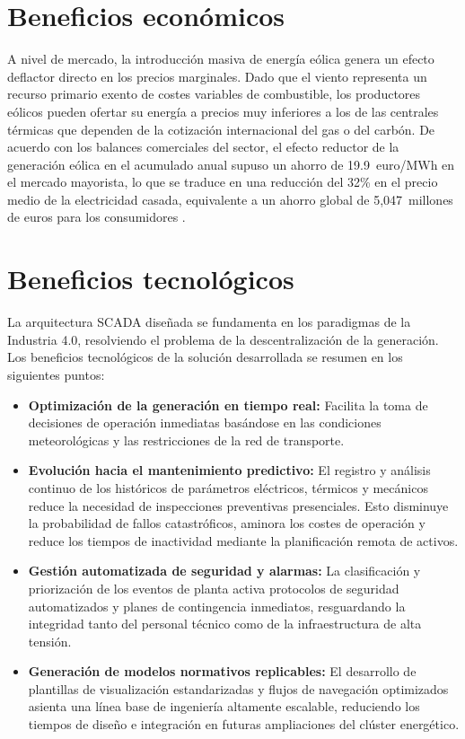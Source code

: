\section{Beneficios económicos}
\label{subsec:beneficios_economicos}

A nivel de mercado, la introducción masiva de energía eólica genera un efecto deflactor directo en los precios marginales\cite{FIGUEIREDO201954}. Dado que el viento representa un recurso primario exento de costes variables de combustible, los productores eólicos pueden ofertar su energía a precios muy inferiores a los de las centrales térmicas que dependen de la cotización internacional del gas o del carbón. De acuerdo con los balances comerciales del sector, el efecto reductor de la generación eólica en el acumulado anual supuso un ahorro de 19.9~euro/$\text{MWh}$ en el mercado mayorista, lo que se traduce en una reducción del 32\% en el precio medio de la electricidad casada, equivalente a un ahorro global de 5,047~millones de euros para los consumidores \cite{aeeAnuario2025}.

\section{Beneficios tecnológicos}
\label{subsec:beneficios_scada}

La arquitectura \ac{SCADA} diseñada se fundamenta en los paradigmas de la Industria 4.0, resolviendo el problema de la descentralización de la generación. Los beneficios tecnológicos de la solución desarrollada se resumen en los siguientes puntos:
\begin{itemize}
    \item \textbf{Optimización de la generación en tiempo real:} Facilita la toma de decisiones de operación inmediatas basándose en las condiciones meteorológicas y las restricciones de la red de transporte.
    \item \textbf{Evolución hacia el mantenimiento predictivo:} El registro y análisis continuo de los históricos de parámetros eléctricos, térmicos y mecánicos reduce la necesidad de inspecciones preventivas presenciales. Esto disminuye la probabilidad de fallos catastróficos, aminora los costes de operación y reduce los tiempos de inactividad mediante la planificación remota de activos.
    \item \textbf{Gestión automatizada de seguridad y alarmas:} La clasificación y priorización de los eventos de planta activa protocolos de seguridad automatizados y planes de contingencia inmediatos, resguardando la integridad tanto del personal técnico como de la infraestructura de alta tensión.
    \item \textbf{Generación de modelos normativos replicables:} El desarrollo de plantillas de visualización estandarizadas y flujos de navegación optimizados asienta una línea base de ingeniería altamente escalable, reduciendo los tiempos de diseño e integración en futuras ampliaciones del clúster energético.
\end{itemize}

